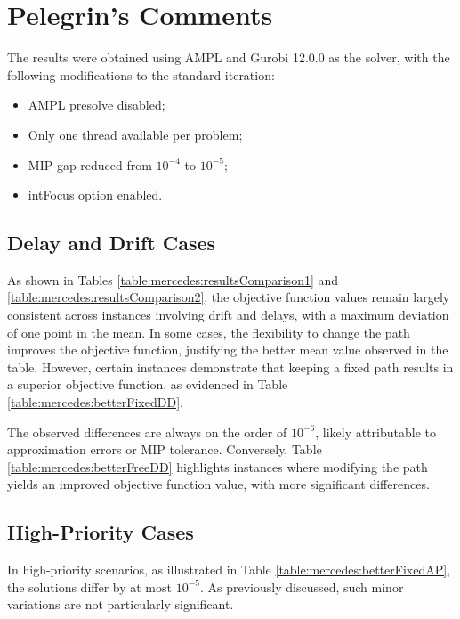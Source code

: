 \documentclass[../../../thesis.tex]{subfiles}
\begin{document}
\section{Pelegrin's Comments}
The results were obtained using AMPL and Gurobi 12.0.0 as the solver, with the following modifications to the standard iteration:
\begin{itemize}
    \item AMPL presolve disabled;
    \item Only one thread available per problem;
    \item MIP gap reduced from $10^{-4}$ to $10^{-5}$;
    \item intFocus option enabled.
\end{itemize}

\subsection{Delay and Drift Cases}
As shown in Tables \ref{table:mercedes:resultsComparison1} and \ref{table:mercedes:resultsComparison2}, the objective function values remain largely consistent across instances involving drift and delays, with a maximum deviation of one point in the mean. In some cases, the flexibility to change the path improves the objective function, justifying the better mean value observed in the table. However, certain instances demonstrate that keeping a fixed path results in a superior objective function, as evidenced in Table \ref{table:mercedes:betterFixedDD}.



The observed differences are always on the order of $10^{-6}$, likely attributable to approximation errors or MIP tolerance. Conversely, Table \ref{table:mercedes:betterFreeDD} highlights instances where modifying the path yields an improved objective function value, with more significant differences.



\subsection{High-Priority Cases}
In high-priority scenarios, as illustrated in Table \ref{table:mercedes:betterFixedAP}, the solutions differ by at most $10^{-5}$. As previously discussed, such minor variations are not particularly significant.


\end{document}
